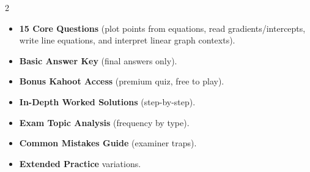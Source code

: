 \documentclass[11pt,a4paper]{article}
\newcommand{\FullReleaseDate}{April 30, 2026}
\begin{document}
\vspace{8pt}

\begin{multicols}{2}
  \begin{tcolorbox}[card, title=\sffamily\bfseries\textcolor{white}{\faHandPointDown\ TODAY (Simplified Version)}, colbacktitle=mainblue, boxed title style={sharp corners, boxrule=0pt}]
    \begin{itemize}[leftmargin=1.2em, itemsep=2pt]
      \item \small \textbf{15 Core Questions} (plot points from equations, read gradients/intercepts, write line equations, and interpret linear graph contexts).
      \item \small \textbf{Basic Answer Key} (final answers only).
      \item \small \textbf{Bonus Kahoot Access} (premium quiz, free to play).
    \end{itemize}
  \end{tcolorbox}

  \columnbreak

  \begin{tcolorbox}[card, title=\sffamily\bfseries\textcolor{white}{\faRocket\ ON \FullReleaseDate\ (Full Upgrade)}, colbacktitle=mainblue, boxed title style={sharp corners, boxrule=0pt}]
    \begin{itemize}[leftmargin=1.2em, itemsep=2pt]
      \item \small \textbf{In-Depth Worked Solutions} (step-by-step).
      \item \small \textbf{Exam Topic Analysis} (frequency by type).
      \item \small \textbf{Common Mistakes Guide} (examiner traps).
      \item \small \textbf{Extended Practice} variations.
    \end{itemize}
  \end{tcolorbox}
\end{multicols}
\end{document}
